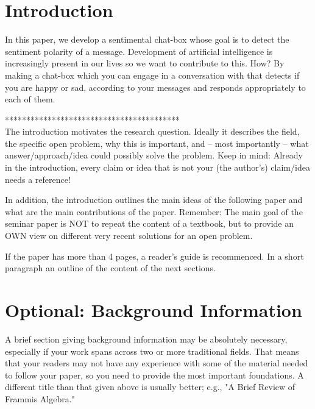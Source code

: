 \documentclass[12pt,twoside]{article}
\theoremstyle{plain}
\theoremstyle{definition}
\theoremstyle{remark}
\begin{document}
\setcounter{tocdepth}{2} 					%
\tableofcontents

\clearpage



\section{Introduction}
\label{sec:introduction}


In this paper, we develop a sentimental chat-box whose goal is to detect the sentiment polarity of a message. Development of artificial intelligence is increasingly present in our lives so we want to contribute to this. How? By making a chat-box which you can engage in a conversation with that detects if you are happy or sad, according to your messages and responds appropriately to each of them.

*****************************************\\
The introduction motivates the research question. Ideally it describes the field, the specific open problem, why this is important, and -- most importantly -- what answer/approach/idea could possibly solve the problem. Keep in mind: Already in the introduction, every claim or idea that is not your (the author's) claim/idea needs a reference!

In addition, the introduction outlines the main ideas of the following paper and what are the main contributions of the paper. Remember: The main goal of the seminar paper is NOT to repeat the content of a textbook, but to provide an OWN view on different very recent solutions for an open problem.

If the paper has more than 4 pages, a reader's guide is recommenced. In a short paragraph an outline of the content of the next sections.

\section{Optional: Background Information}
\label{sec:basics}
A brief section giving background information may be absolutely necessary, especially if your work spans across two or more traditional fields. That means that your readers may not have any experience with some of the material needed to follow your paper, so you need to provide the most important foundations. A different title than that given above is usually better; e.g., "A Brief Review of Frammis Algebra."
\end{document}
